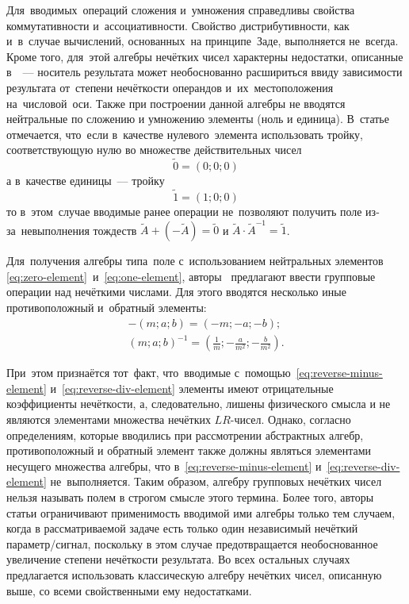 Для~вводимых~операций сложения и~умножения справедливы свойства коммутативности и~ассоциативности. Свойство дистрибутивности, как и~в~случае вычислений, основанных~на принципе~Заде, выполняется не~всегда. Кроме того, для~этой алгебры нечётких чисел характерны недостатки, описанные в~\cite{Spesivtsev, Yakhyaeva}~--– носитель результата может необоснованно расшириться ввиду зависимости результата от~степени нечёткости операндов и~их~местоположения на~числовой~оси. Также при построении данной алгебры не вводятся нейтральные по сложению и умножению элементы (ноль и единица). В~статье~\cite{Uskov_PPS} отмечается, что~если в~качестве нулевого~элемента использовать тройку, соответствующую нулю во множестве действительных чисел
\begin{equation}
\label{eq:zero-element}
	\tilde{0}=\left( 0;0;0 \right)
\end{equation}
а в~качестве единицы~--– тройку
\begin{equation}
\label{eq:one-element}
	\tilde{1}=\left( 1;0;0 \right)
\end{equation}
то в~этом~случае вводимые ранее операции не~позволяют получить поле из-за~невыполнения тождеств $\tilde{A}+\left( -\tilde{A} \right)=\tilde{0}$ и $\tilde{A}\cdot {{\tilde{A}}^{-1}}=\tilde{1}$.

Для~получения алгебры типа~поле с~использованием нейтральных элементов \eqref{eq:zero-element}~и~\eqref{eq:one-element}, авторы~\cite{Uskov_PPS} предлагают ввести групповые операции над нечёткими числами. Для этого вводятся несколько иные противоположный и~обратный элементы:
\begin{gather}
	\label{eq:reverse-minus-element}
	-\left( m;a;b \right)=\left( -m;-a;-b \right); \\ 
	\label{eq:reverse-div-element}
	\left( m;a;b \right)^{-1}=\left( \frac{1}{m};-\frac{a}{{{m}^{2}}};-\frac{b}{{{m}^{2}}} \right). 
\end{gather}

При~этом признаётся тот~факт, что~вводимые с~помощью~\eqref{eq:reverse-minus-element} и~\eqref{eq:reverse-div-element} элементы имеют отрицательные коэффициенты нечёткости, а, следовательно, лишены физического смысла и не являются элементами множества нечётких $LR$-чисел. Однако, согласно определениям, которые вводились при рассмотрении абстрактных алгебр, противоположный и обратный элемент также должны являться элементами несущего множества алгебры, что в~\eqref{eq:reverse-minus-element} и~\eqref{eq:reverse-div-element} не~выполняется. Таким образом, алгебру групповых нечётких чисел нельзя называть полем в строгом смысле этого термина. Более того, авторы статьи ограничивают применимость вводимой ими алгебры только тем случаем, когда в рассматриваемой задаче есть только один независимый нечёткий параметр/сигнал, поскольку в этом случае предотвращается необоснованное увеличение степени нечёткости результата. Во всех остальных случаях предлагается использовать  классическую алгебру нечётких чисел, описанную выше, со всеми свойственными ему недостатками.

